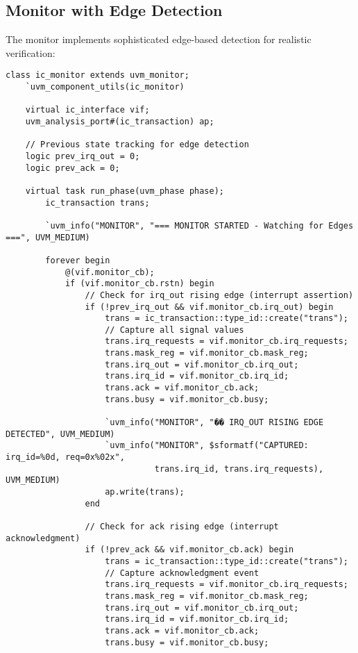 \documentclass[12pt,a4paper]{article}
\begin{document}
\subsection{Monitor with Edge Detection}
The monitor implements sophisticated edge-based detection for realistic verification:

\begin{lstlisting}[caption=Edge-Based Monitor Implementation, label=lst:monitor]
class ic_monitor extends uvm_monitor;
    `uvm_component_utils(ic_monitor)
    
    virtual ic_interface vif;
    uvm_analysis_port#(ic_transaction) ap;
    
    // Previous state tracking for edge detection
    logic prev_irq_out = 0;
    logic prev_ack = 0;
    
    virtual task run_phase(uvm_phase phase);
        ic_transaction trans;
        
        `uvm_info("MONITOR", "=== MONITOR STARTED - Watching for Edges ===", UVM_MEDIUM)
        
        forever begin
            @(vif.monitor_cb);
            if (vif.monitor_cb.rstn) begin
                // Check for irq_out rising edge (interrupt assertion)
                if (!prev_irq_out && vif.monitor_cb.irq_out) begin
                    trans = ic_transaction::type_id::create("trans");
                    // Capture all signal values
                    trans.irq_requests = vif.monitor_cb.irq_requests;
                    trans.mask_reg = vif.monitor_cb.mask_reg;
                    trans.irq_out = vif.monitor_cb.irq_out;
                    trans.irq_id = vif.monitor_cb.irq_id;
                    trans.ack = vif.monitor_cb.ack;
                    trans.busy = vif.monitor_cb.busy;
                    
                    `uvm_info("MONITOR", "�� IRQ_OUT RISING EDGE DETECTED", UVM_MEDIUM)
                    `uvm_info("MONITOR", $sformatf("CAPTURED: irq_id=%0d, req=0x%02x", 
                              trans.irq_id, trans.irq_requests), UVM_MEDIUM)
                    ap.write(trans);
                end
                
                // Check for ack rising edge (interrupt acknowledgment)
                if (!prev_ack && vif.monitor_cb.ack) begin
                    trans = ic_transaction::type_id::create("trans");
                    // Capture acknowledgment event
                    trans.irq_requests = vif.monitor_cb.irq_requests;
                    trans.mask_reg = vif.monitor_cb.mask_reg;
                    trans.irq_out = vif.monitor_cb.irq_out;
                    trans.irq_id = vif.monitor_cb.irq_id;
                    trans.ack = vif.monitor_cb.ack;
                    trans.busy = vif.monitor_cb.busy;
                    

\end{lstlisting}
\end{document}
